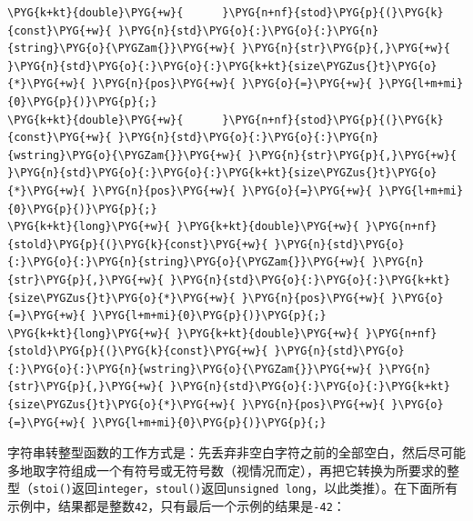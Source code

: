 \begin{codeblockbg}
\begin{Verbatim}[commandchars=\\\{\},breaklines=true,breakanywhere=true,fontsize=\codefont,xleftmargin=17bp]
\PYG{k+kt}{double}\PYG{+w}{      }\PYG{n+nf}{stod}\PYG{p}{(}\PYG{k}{const}\PYG{+w}{ }\PYG{n}{std}\PYG{o}{:}\PYG{o}{:}\PYG{n}{string}\PYG{o}{\PYGZam{}}\PYG{+w}{ }\PYG{n}{str}\PYG{p}{,}\PYG{+w}{ }\PYG{n}{std}\PYG{o}{:}\PYG{o}{:}\PYG{k+kt}{size\PYGZus{}t}\PYG{o}{*}\PYG{+w}{ }\PYG{n}{pos}\PYG{+w}{ }\PYG{o}{=}\PYG{+w}{ }\PYG{l+m+mi}{0}\PYG{p}{)}\PYG{p}{;}
\PYG{k+kt}{double}\PYG{+w}{      }\PYG{n+nf}{stod}\PYG{p}{(}\PYG{k}{const}\PYG{+w}{ }\PYG{n}{std}\PYG{o}{:}\PYG{o}{:}\PYG{n}{wstring}\PYG{o}{\PYGZam{}}\PYG{+w}{ }\PYG{n}{str}\PYG{p}{,}\PYG{+w}{ }\PYG{n}{std}\PYG{o}{:}\PYG{o}{:}\PYG{k+kt}{size\PYGZus{}t}\PYG{o}{*}\PYG{+w}{ }\PYG{n}{pos}\PYG{+w}{ }\PYG{o}{=}\PYG{+w}{ }\PYG{l+m+mi}{0}\PYG{p}{)}\PYG{p}{;}
\PYG{k+kt}{long}\PYG{+w}{ }\PYG{k+kt}{double}\PYG{+w}{ }\PYG{n+nf}{stold}\PYG{p}{(}\PYG{k}{const}\PYG{+w}{ }\PYG{n}{std}\PYG{o}{:}\PYG{o}{:}\PYG{n}{string}\PYG{o}{\PYGZam{}}\PYG{+w}{ }\PYG{n}{str}\PYG{p}{,}\PYG{+w}{ }\PYG{n}{std}\PYG{o}{:}\PYG{o}{:}\PYG{k+kt}{size\PYGZus{}t}\PYG{o}{*}\PYG{+w}{ }\PYG{n}{pos}\PYG{+w}{ }\PYG{o}{=}\PYG{+w}{ }\PYG{l+m+mi}{0}\PYG{p}{)}\PYG{p}{;}
\PYG{k+kt}{long}\PYG{+w}{ }\PYG{k+kt}{double}\PYG{+w}{ }\PYG{n+nf}{stold}\PYG{p}{(}\PYG{k}{const}\PYG{+w}{ }\PYG{n}{std}\PYG{o}{:}\PYG{o}{:}\PYG{n}{wstring}\PYG{o}{\PYGZam{}}\PYG{+w}{ }\PYG{n}{str}\PYG{p}{,}\PYG{+w}{ }\PYG{n}{std}\PYG{o}{:}\PYG{o}{:}\PYG{k+kt}{size\PYGZus{}t}\PYG{o}{*}\PYG{+w}{ }\PYG{n}{pos}\PYG{+w}{ }\PYG{o}{=}\PYG{+w}{ }\PYG{l+m+mi}{0}\PYG{p}{)}\PYG{p}{;}
\end{Verbatim}
\end{codeblockbg}



字符串转整型函数的工作方式是：先丢弃非空白字符之前的全部空白，然后尽可能多地取字符组成一个有符号或无符号数（视情况而定），再把它转换为所要求的整型（\texttt{stoi()}返回\texttt{integer}，\texttt{stoul()}返回\texttt{unsigned long}，以此类推）。在下面所有示例中，结果都是整数\texttt{42}，只有最后一个示例的结果是\texttt{-\allowbreak{}42}：



